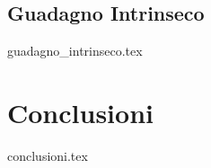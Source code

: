 \documentclass[
	a4paper,
	cleardoublepage=empty,
	headings=twolinechapter,
	numbers=autoenddot,
]{scrbook}
\begin{document}
\section{Guadagno Intrinseco}
{guadagno_intrinseco.tex}


\chapter*{Conclusioni}
{conclusioni.tex}

\backmatter




\end{document}
